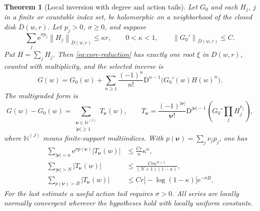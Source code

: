 \documentclass[11pt,a4paper]{article}
\numberwithin{equation}{section}
\newtheorem{theorem}{Theorem}[section]
\theoremstyle{definition}
\theoremstyle{remark}
\newcommand{\N}{\mathbb N}
\newcommand{\D}{\mathrm D}
\newcommand{\e}{\mathrm e}
\newcommand{\norm}[1]{\left\|#1\right\|}
\newcommand{\nn}{\boldsymbol\nu}
\begin{document}
\begin{theorem}[Local inversion with degree and action tails]\label{thm:weighted}
Let $G_0$ and each $H_j$, $j$ in a finite or countable index set, be
holomorphic on a neighborhood of the closed disk $\overline D(w,r)$. Let
$p_j>0$, $\sigma\ge0$, and suppose
\begin{equation}\label{eq:weighted-hyp}
 \sum_j\e^{\sigma p_j}\norm{H_j}_{\overline D(w,r)}
 \le\kappa r,\qquad 0<\kappa<1,
 \qquad \norm{G_0'}_{\overline D(w,r)}\le C.
\end{equation}
Put $H=\sum_jH_j$. Then \eqref{eq:core-reduction} has exactly one root
$\xi$ in $D(w,r)$, counted with multiplicity, and the selected inverse is
\begin{equation}\label{eq:core-lagrange}
 G(w)=G_0(w)+\sum_{n\ge1}\frac{(-1)^n}{n!}
 \D^{n-1}\bigl(G_0'(w)H(w)^n\bigr).
\end{equation}
The multigraded form is
\begin{equation}\label{eq:multigraded}
 G(w)-G_0(w)=\sum_{\substack{\nn\in\N^{(J)}\\|\nn|\ge1}}T_{\nn}(w),
 \qquad
 T_{\nn}=\frac{(-1)^{|\nn|}}{\nn!}
 \D^{|\nn|-1}\left(G_0'\prod_jH_j^{\nu_j}\right),
\end{equation}
where $\N^{(J)}$ means finite-support multiindices. With
$p(\nn)=\sum_j\nu_jp_j$, one has
\begin{align}
 \sum_{|\nn|=n}\e^{\sigma p(\nn)}|T_{\nn}(w)|
 &\le\frac{Cr}{n}\kappa^n,\label{eq:degree-weighted}\\
 \sum_{|\nn|>N}|T_{\nn}(w)|
 &\le\frac{Cr\kappa^{N+1}}{(N+1)(1-\kappa)},\label{eq:degree-tail}\\
 \sum_{p(\nn)>B}|T_{\nn}(w)|
 &\le Cr\bigl[-\log(1-\kappa)\bigr]\e^{-\sigma B}.
 \label{eq:action-tail}
\end{align}
For the last estimate a useful action tail requires $\sigma>0$.
All series are locally normally convergent wherever the hypotheses hold
with locally uniform constants.
\end{theorem}
\end{document}
